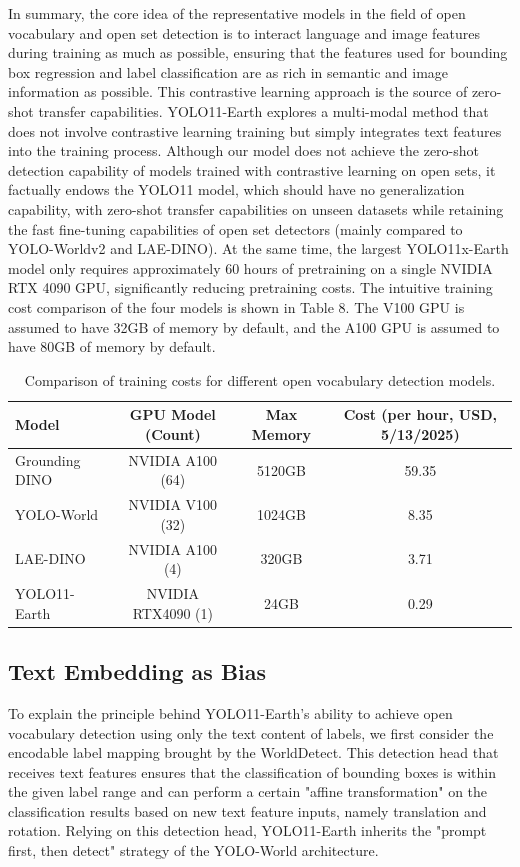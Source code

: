 \documentclass{article}
\begin{document}
In summary, the core idea of the representative models in the field of open vocabulary and open set detection 
is to interact language and image features during training as much as possible, ensuring that the features 
used for bounding box regression and label classification are as rich in semantic and image information as 
possible. This contrastive learning approach is the source of zero-shot transfer capabilities.
YOLO11-Earth explores a multi-modal method that does not involve contrastive learning training but simply 
integrates text features into the training process. Although our model does not achieve the zero-shot 
detection capability of models trained with contrastive learning on open sets, it factually endows 
the YOLO11 model, which should have no generalization capability, with zero-shot transfer capabilities 
on unseen datasets while retaining the fast fine-tuning capabilities of open set detectors (mainly compared 
to YOLO-Worldv2 and LAE-DINO). At the same time, the largest YOLO11x-Earth model only requires approximately 
60 hours of pretraining on a single NVIDIA RTX 4090 GPU, significantly reducing pretraining costs. The intuitive 
training cost comparison of the four models is shown in Table 8. The V100 GPU is assumed to have 32GB of 
memory by default, and the A100 GPU is assumed to have 80GB of memory by default.

\begin{table}[ht]
\centering
\caption{Comparison of training costs for different open vocabulary detection models.}
\begin{tabular}{lccc}
\toprule
\textbf{Model} & \textbf{GPU Model (Count)} & \textbf{Max Memory} & \textbf{Cost (per hour, USD, 5/13/2025)} \\
\midrule
Grounding DINO & NVIDIA A100 (64) & 5120GB & 59.35 \\
YOLO-World & NVIDIA V100 (32) & 1024GB & 8.35 \\
LAE-DINO & NVIDIA A100 (4) & 320GB & 3.71 \\
YOLO11-Earth & NVIDIA RTX4090 (1) & 24GB & 0.29 \\
\bottomrule
\end{tabular}
\end{table}

\subsection{Text Embedding as Bias}
To explain the principle behind YOLO11-Earth's ability to achieve open vocabulary detection using only the text 
content of labels, we first consider the encodable label mapping brought by the WorldDetect. This detection head 
that receives text features ensures that the classification of bounding boxes is within the given label range and 
can perform a certain "affine transformation" on the classification results based on new text feature inputs, 
namely translation and rotation. Relying on this detection head, YOLO11-Earth inherits the "prompt first, then 
detect" strategy of the YOLO-World architecture.
\end{document}
